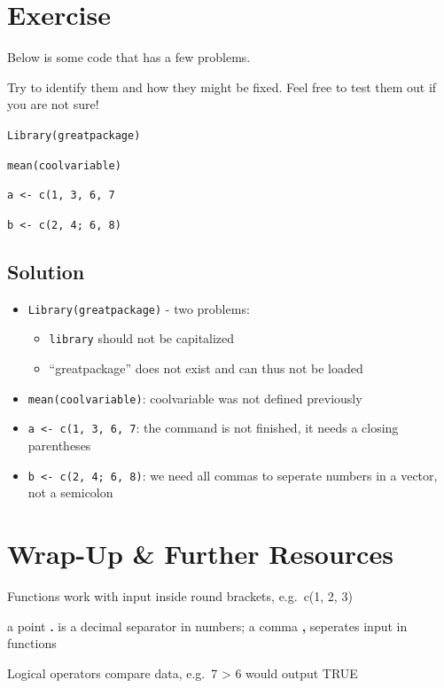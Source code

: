 \documentclass[
]{book}
\providecommand{\tightlist}{%
  \setlength{\itemsep}{0pt}\setlength{\parskip}{0pt}}
\begin{document}
\section{Exercise}\label{exercise-2}

Below is some code that has a few problems.

Try to identify them and how they might be fixed. Feel free to test them out if you are not sure!

\texttt{Library(greatpackage)}

\texttt{mean(coolvariable)}

\texttt{a\ \textless{}-\ c(1,\ 3,\ 6,\ 7}

\texttt{b\ \textless{}-\ c(2,\ 4;\ 6,\ 8)}

\subsection{Solution}\label{solution-2}

\begin{itemize}
\tightlist
\item
  \texttt{Library(greatpackage)} - two problems:

  \begin{itemize}
  \tightlist
  \item
    \texttt{library} should not be capitalized
  \item
    ``greatpackage'' does not exist and can thus not be loaded
  \end{itemize}
\item
  \texttt{mean(coolvariable)}: coolvariable was not defined previously
\item
  \texttt{a\ \textless{}-\ c(1,\ 3,\ 6,\ 7}: the command is not finished, it needs a closing parentheses
\item
  \texttt{b\ \textless{}-\ c(2,\ 4;\ 6,\ 8)}: we need all commas to seperate numbers in a vector, not a semicolon
\end{itemize}

\section{Wrap-Up \& Further Resources}\label{wrap-up-further-resources}

Functions work with input inside round brackets, e.g.~c(1, 2, 3)

a point \textbf{.} is a decimal separator in numbers; a comma \textbf{,} seperates input in functions

Logical operators compare data, e.g.~7 \textgreater{} 6 would output TRUE
\end{document}
